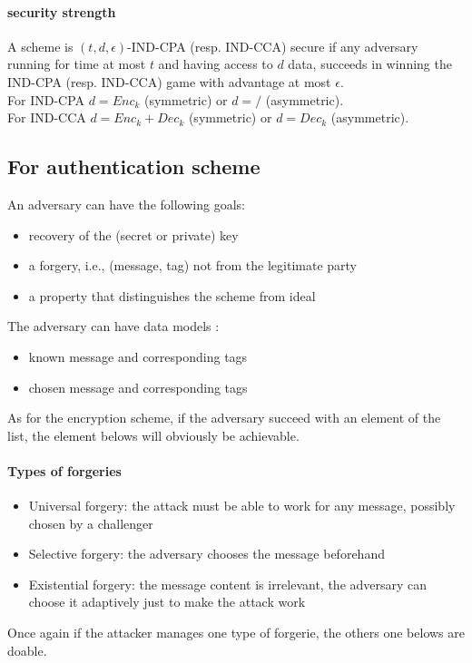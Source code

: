 \documentclass[11pt,a4paper]{report}
\begin{document}
\paragraph{security strength}
A scheme is $(t, d, \epsilon)$-IND-CPA (resp. IND-CCA) secure if any adversary running for time at most $t$ and having access to $d$ data, succeeds in winning the IND-CPA (resp. IND-CCA) game with advantage at most $\epsilon$.\\
For IND-CPA $d = Enc_k$ (symmetric) or $d = /$ (asymmetric).\\
For IND-CCA $d = Enc_k + Dec_k$ (symmetric) or $d = Dec_k$ (asymmetric).


\subsection{For authentication scheme}
An adversary can have the following goals:
\begin{itemize}
\item recovery of the (secret or private) key
\item a forgery, i.e., (message, tag) not from the legitimate party
\item a property that distinguishes the scheme from ideal
\end{itemize}

The adversary can have data models :
\begin{itemize}
\item known message and corresponding tags
\item chosen message and corresponding tags
\end{itemize}
As for the encryption scheme, if the adversary succeed with an element of the list, the element belows will obviously be achievable.

\paragraph{Types of forgeries}
\begin{itemize}
\item Universal forgery: the attack must be able to work for any message, possibly chosen by a challenger
\item Selective forgery: the adversary chooses the message beforehand
\item Existential forgery: the message content is irrelevant, the adversary can choose it adaptively just to make the attack work
\end{itemize}
Once again if the attacker manages one type of forgerie, the others one belows are doable.
\end{document}
